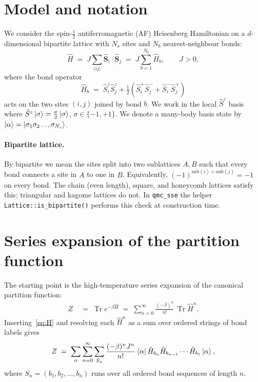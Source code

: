 \documentclass[11pt,a4paper]{article}
\renewcommand{\Tr}{\operatorname{Tr}}
\newcommand{\Hop}{\hat H}
\newcommand{\Sop}{\hat{\mathbf S}}
\newcommand{\Sz}{\hat S^z}
\newcommand{\Sp}{\hat S^+}
\newcommand{\Sm}{\hat S^-}
\newcommand{\Hb}{\hat H_b}
\newcommand{\NN}{\langle ij\rangle}
\newcommand{\Nb}{N_{b}}
\newcommand{\Ns}{N_{s}}
\theoremstyle{definition}
\theoremstyle{plain}
\begin{document}
\section{Model and notation}\label{sec:model}
We consider the spin-$\tfrac12$ antiferromagnetic (AF) Heisenberg
Hamiltonian on a $d$-dimensional bipartite lattice with $\Ns$ sites
and $\Nb$ nearest-neighbour bonds:
\begin{equation}\label{eq:H}
    \Hop \;=\; J \sum_{\NN} \Sop_i \cdot \Sop_j
        \;=\; J \sum_{b=1}^{\Nb}\!\!\Hb,
    \qquad J>0,
\end{equation}
where the bond operator
\begin{equation}\label{eq:Hb}
    \Hb \;=\; \Sz_i\Sz_j + \tfrac12\!\left(\Sp_i\Sm_j + \Sm_i\Sp_j\right)
\end{equation}
acts on the two sites $(i,j)$ joined by bond $b$. We work in the
local $\Sz$ basis where $\Sz\ket{\sigma}=\tfrac{\sigma}{2}\ket{\sigma}$,
$\sigma\in\{-1,+1\}$. We denote a many-body basis state by
$\ket{\alpha} = \ket{\sigma_1\sigma_2\dots\sigma_{\Ns}}$.

\paragraph{Bipartite lattice.}
By bipartite we mean the sites split into two sublattices $A,B$ such
that every bond connects a site in $A$ to one in $B$. Equivalently,
$(-1)^{\text{sub}(i)+\text{sub}(j)}=-1$ on every bond. The chain (even
length), square, and honeycomb lattices satisfy this; triangular and
kagome lattices do not. In \texttt{qmc\_sse} the helper
\lstinline|Lattice::is_bipartite()| performs this check at
construction time.

\section{Series expansion of the partition function}\label{sec:series}
The starting point is the high-temperature series expansion of the
canonical partition function:
\begin{align}
    Z &\;=\; \Tr e^{-\beta\Hop}
       \;=\; \sum_{n=0}^{\infty} \frac{(-\beta)^n}{n!}\,\Tr\Hop^n.
       \label{eq:Z-expand}
\end{align}
Inserting~\cref{eq:H} and resolving each $\Hop^n$ as a sum over
ordered strings of bond labels gives
\begin{equation}\label{eq:Z-string}
    Z \;=\; \sum_{\alpha}\sum_{n=0}^{\infty}\sum_{S_n}
            \frac{(-\beta)^n J^n}{n!}
            \mel{\alpha}{\,\hat H_{b_n}\hat H_{b_{n-1}}\cdots\hat H_{b_1}\,}{\alpha},
\end{equation}
where $S_n=(b_1,b_2,\dots,b_n)$ runs over all ordered bond sequences
of length $n$.
\end{document}
